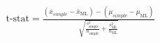 \begin{align*}
    \text{t-stat} = \frac{(\bar{x}_{simple} - \bar{x}_\text{ML}) - (\mu_{simple} - \mu_\text{ML})}{\sqrt{\frac{s_{\text{simple}}^2}{n_\text{simple}}+\frac{s_{\text{ML}}^2}{n_\text{ML}}}}
\end{align*}
